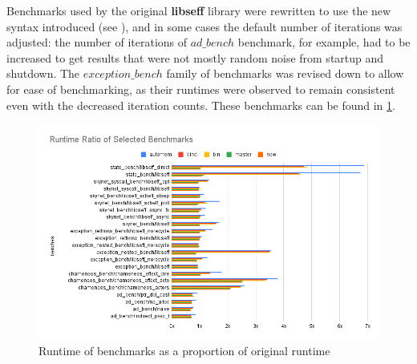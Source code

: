 \documentclass[logo,bsc,singlespacing,parskip,online]{infthesis}
\begin{document}

Benchmarks used by the original \textbf{libseff} library were rewritten to use the new syntax introduced (see ), and in some cases the default number of iterations was adjusted: the number of iterations of $ad\_bench$ benchmark, for example, had to be increased to get results that were not mostly random noise from startup and shutdown. The $exception\_bench$ family of benchmarks was revised down to allow for ease of benchmarking, as their runtimes were observed to remain consistent even with the decreased iteration counts. These benchmarks can be found in \cref{fig:many}.

\begin{figure}[ht]
    \centering
    \includegraphics[width=1\linewidth]{all_new.png}
    \caption{Runtime of benchmarks as a proportion of original runtime}
    \label{fig:many}
\end{figure}
\end{document}
